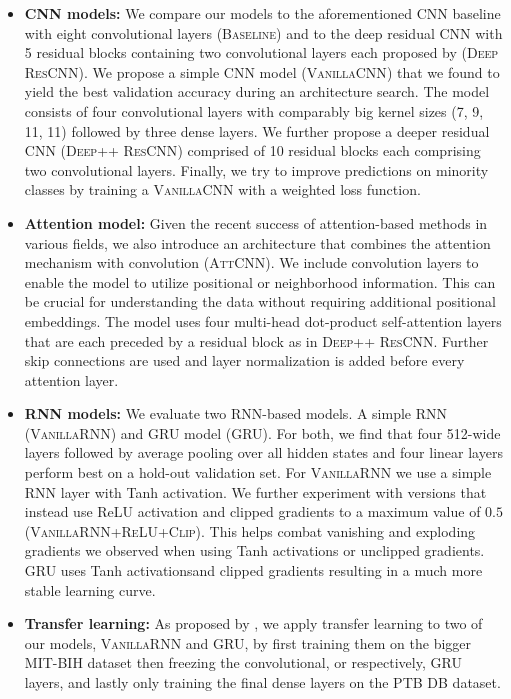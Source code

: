 \begin{itemize}[leftmargin=0cm]
    \setlength\itemsep{0.6em}
    \item[]
    \textbf{CNN models:} We compare our models to the aforementioned CNN baseline with eight convolutional layers (\textsc{Baseline}) and to the deep residual CNN with 5 residual blocks containing two convolutional layers each proposed by \citet{kachuee2018ecg} (\textsc{Deep ResCNN}). We propose a simple CNN model (\textsc{VanillaCNN}) that we found to yield the best validation accuracy during an architecture search. The model consists of four convolutional layers with comparably big kernel sizes (7, 9, 11, 11) followed by three dense layers. We further propose a deeper residual CNN (\textsc{Deep++ ResCNN}) comprised of 10 residual blocks each comprising two convolutional layers. Finally, we try to improve predictions on minority classes by training a \textsc{VanillaCNN} with a weighted loss function.
    
    \item[]
    \textbf{Attention model:} Given the recent success of attention-based methods in various fields, we also introduce an architecture that combines the attention mechanism with convolution (\textsc{AttCNN}). We include convolution layers to enable the model to utilize positional or neighborhood information. This can be crucial for understanding the data without requiring additional positional embeddings. The model uses four multi-head dot-product self-attention layers that are each preceded by a residual block as in \textsc{Deep++ ResCNN}. Further skip connections are used and layer normalization is added before every attention layer.
    
    \item[]
    \textbf{RNN models:} We evaluate two RNN-based models. A simple RNN (\textsc{VanillaRNN}) and GRU model (\textsc{GRU}). For both, we find that four 512-wide layers followed by average pooling over all hidden states and four linear layers perform best on a hold-out validation set. For \textsc{VanillaRNN} we use a simple RNN layer with Tanh activation. We further experiment with versions that instead use ReLU activation and clipped gradients to a maximum value of $0.5$ (\textsc{VanillaRNN+ReLU+Clip}). This helps combat vanishing and exploding gradients we observed when using Tanh activations or unclipped gradients. \textsc{GRU} uses Tanh activationsand clipped gradients resulting in a much more stable learning curve.
    
    \item[]
    \textbf{Transfer learning:} As proposed by \citet{kachuee2018ecg}, we apply transfer learning to two of our models, \textsc{VanillaRNN} and \textsc{GRU}, by first training them on the bigger MIT-BIH dataset then freezing the convolutional, or respectively, GRU layers, and lastly only training the final dense layers on the PTB DB dataset.
    

\end{itemize}

